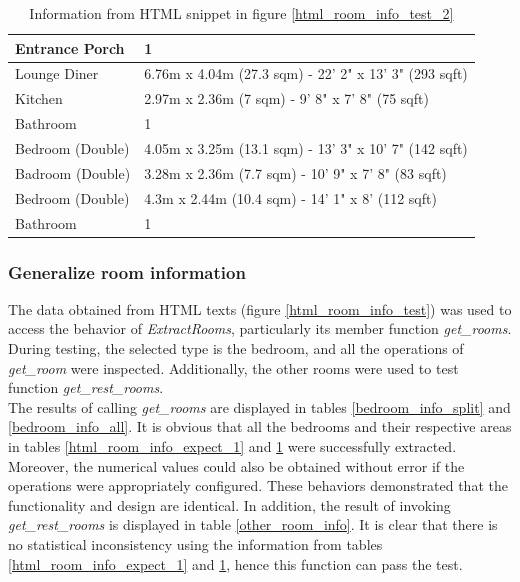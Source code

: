 \documentclass[12pt,twoside]{report}
\begin{document}
\begin{table}[h]
	\centering
	\caption{Information from HTML snippet in figure \ref*{html_room_info_test_2}}
	\begin{tabular} {| l | l |}
		\hline
		Entrance Porch & 1\\
		\hline
		Lounge Diner & 6.76m x 4.04m (27.3 sqm) - 22' 2" x 13' 3" (293 sqft)\\
		\hline
		Kitchen & 2.97m x 2.36m (7 sqm) - 9' 8" x 7' 8" (75 sqft)\\
		\hline
		Bathroom & 1\\
		\hline
		Bedroom (Double) & 4.05m x 3.25m (13.1 sqm) - 13' 3" x 10' 7" (142 sqft)\\
		\hline 
		Badroom (Double) & 3.28m x 2.36m (7.7 sqm) - 10' 9" x 7' 8" (83 sqft)\\
		\hline
		Bedroom (Double) & 4.3m x 2.44m (10.4 sqm) - 14' 1" x 8' (112 sqft)\\
		\hline
		Bathroom & 1\\
		\hline
	\end{tabular}
	\label{html_room_info_expect_2}
\end{table}

\subsubsection{Generalize room information}
The data obtained from HTML texts (figure \ref{html_room_info_test}) was used to access the behavior of \textit{ExtractRooms}, particularly its member function \textit{get\_rooms}. During testing, the selected type is the bedroom, and all the operations of \textit{get\_room} were inspected. Additionally, the other rooms were used to test function \textit{get\_rest\_rooms}. 
\\

The results of calling \textit{get\_rooms} are displayed in tables \ref{bedroom_info_split} and \ref{bedroom_info_all}. It is obvious that all the bedrooms and their respective areas in tables \ref{html_room_info_expect_1} and \ref{html_room_info_expect_2} were successfully extracted. Moreover, the numerical values could also be obtained without error if the operations were appropriately configured. These behaviors demonstrated that the functionality and design are identical. In addition, the result of invoking \textit{get\_rest\_rooms} is displayed in table \ref{other_room_info}. It is clear that there is no statistical inconsistency using the information from tables \ref{html_room_info_expect_1} and \ref{html_room_info_expect_2}, hence this function can pass the test. 
\end{document}
